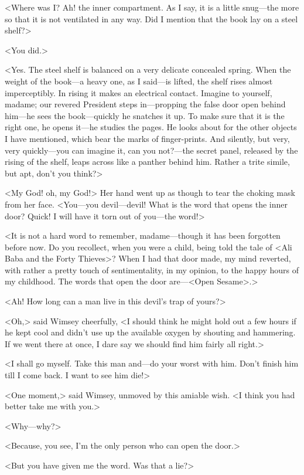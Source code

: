 <Where was I\@? Ah! the inner compartment. As I say, it is a little snug—the more so that it is not ventilated in any way. Did I mention that the book lay on a steel shelf?>

<You did.>

<Yes. The steel shelf is balanced on a very delicate concealed spring. When the weight of the book—a heavy one, as I said—is lifted, the shelf rises almost imperceptibly. In rising it makes an electrical contact. Imagine to yourself, madame; our revered President steps in—propping the false door open behind him—he sees the book—quickly he snatches it up. To make sure that it is the right one, he opens it—he studies the pages. He looks about for the other objects I have mentioned, which bear the marks of finger-prints. And silently, but very, very quickly—you can imagine it, can you not?—the secret panel, released by the rising of the shelf, leaps across like a panther behind him. Rather a trite simile, but apt, don't you think?>

<My God! oh, my God!> Her hand went up as though to tear the choking mask from her face. <You—you devil—devil! What is the word that opens the inner door? Quick! I will have it torn out of you—the word!>

<It is not a hard word to remember, madame—though it has been forgotten before now. Do you recollect, when you were a child, being told the tale of <Ali Baba and the Forty Thieves>? When I had that door made, my mind reverted, with rather a pretty touch of sentimentality, in my opinion, to the happy hours of my childhood. The words that open the door are—<Open Sesame>.>

<Ah! How long can a man live in this devil's trap of yours?>

<Oh,> said Wimsey cheerfully, <I should think he might hold out a few hours if he kept cool and didn't use up the available oxygen by shouting and hammering. If we went there at once, I dare say we should find him fairly all right.>

<I shall go myself. Take this man and—do your worst with him. Don't finish him till I come back. I want to see him die!>

<One moment,> said Wimsey, unmoved by this amiable wish. <I think you had better take me with you.>

<Why—why?>

<Because, you see, I'm the only person who can open the door.>

<But you have given me the word. Was that a lie?>

